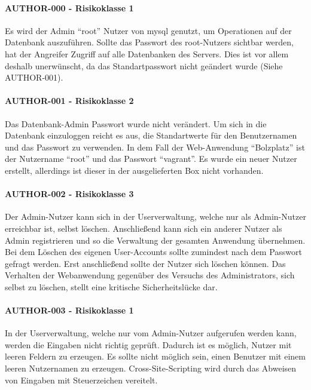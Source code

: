 \paragraph{AUTHOR-000 - Risikoklasse 1}
Es wird der Admin “root” Nutzer von mysql genutzt, um Operationen auf der Datenbank auszuführen. Sollte das Passwort des root-Nutzers sichtbar werden, hat der Angreifer Zugriff auf alle Datenbanken des Servers. Dies ist vor allem deshalb unerwünscht, da das Standartpasswort nicht geändert wurde (Siehe AUTHOR-001).

\clearpage
\paragraph{AUTHOR-001 - Risikoklasse 2}
Das Datenbank-Admin Passwort wurde nicht verändert.
Um sich in die Datenbank einzuloggen reicht es aus, die Standartwerte für den Benutzernamen und das Passwort zu verwenden. In dem Fall der Web-Anwendung “Bolzplatz” ist der Nutzername “root” und das Passwort “vagrant”. Es wurde ein neuer Nutzer erstellt, allerdings ist dieser in der ausgelieferten Box nicht vorhanden.


\paragraph{AUTHOR-002 - Risikoklasse 3}
Der Admin-Nutzer kann sich in der Userverwaltung, welche nur als Admin-Nutzer erreichbar ist,  selbst löschen. Anschließend kann sich ein anderer Nutzer als Admin registrieren und so die Verwaltung der gesamten Anwendung übernehmen. Bei dem Löschen des eigenen User-Accounts sollte zumindest nach dem Passwort gefragt werden. Erst anschließend sollte der Nutzer sich löschen können. Das Verhalten der Webanwendung gegenüber des Versuchs des Administrators, sich selbst zu löschen, stellt eine kritische Sicherheitslücke dar.

\clearpage
\paragraph{AUTHOR-003 - Risikoklasse 1}
In der Userverwaltung, welche nur vom Admin-Nutzer aufgerufen werden kann, werden die Eingaben nicht richtig geprüft. Dadurch ist es möglich, Nutzer mit leeren Feldern zu erzeugen. Es sollte nicht möglich sein, einen Benutzer mit einem leeren Nutzernamen zu erzeugen. Cross-Site-Scripting wird durch das Abweisen von Eingaben mit Steuerzeichen vereitelt.

